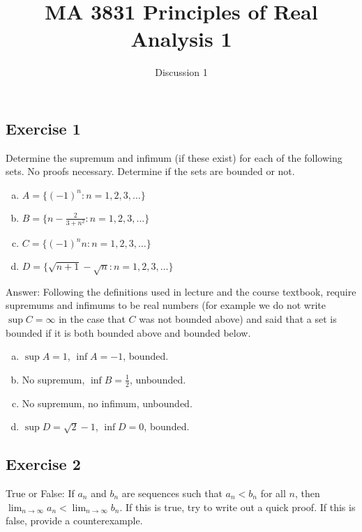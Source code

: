 \documentclass{article}
\title{MA 3831 Principles of Real Analysis 1 }
\author{Discussion 1}
\begin{document}
\maketitle


\subsection*{Exercise 1}
Determine the supremum and infimum (if these exist) for each of the following sets. No proofs necessary. Determine if the sets are bounded or not.

\begin{enumerate}[a)]
\item $A = \{(-1)^n : n = 1,2,3,\dots \}$

\item $B = \big\lbrace n - \frac{2}{3+n^2} : n = 1,2,3,\dots \big\rbrace$

\item $C = \{(-1)^nn : n = 1,2,3,\dots \}$

\item $D = \{\sqrt{n+1} - \sqrt{n} : n = 1,2,3,\dots \}$
\end{enumerate}

Answer: Following the definitions used in lecture and the course textbook, require supremums and infimums to be real numbers (for example we do not write $\sup C = \infty$ in the case that $C$ was not bounded above) and said that a set is bounded if it is both bounded above and bounded below.

\begin{enumerate}[a)]
\item $\sup A = 1$, $\inf A = -1$, bounded.

\item No supremum, $\inf B = \frac{1}{2}$, unbounded.

\item No supremum, no infimum, unbounded.

\item $\sup D = \sqrt{2}-1$, $\inf D = 0$, bounded.

\end{enumerate}

\subsection*{Exercise 2}
True or False: If $a_n$ and $b_n$ are sequences such that $a_n < b_n$ for all $n$, then $\lim_{n\rightarrow\infty} a_n < \lim_{n\rightarrow \infty} b_n$. If this is true, try to write out a quick proof. If this is false, provide a counterexample.\\
\end{document}
